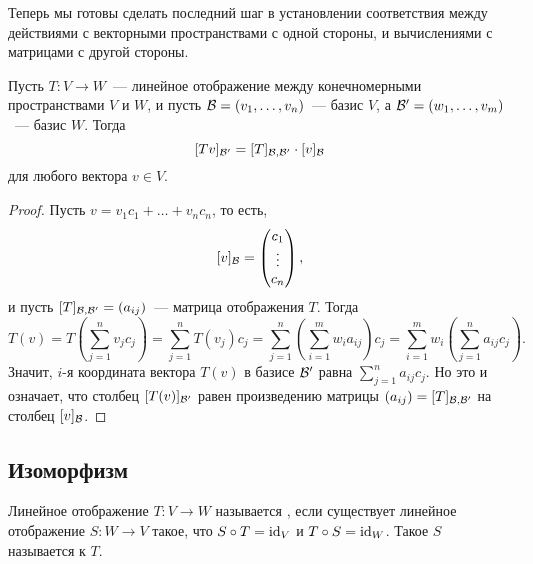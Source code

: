 Теперь мы готовы сделать последний шаг в установлении
соответствия между действиями с векторными пространствами
с одной стороны, и вычислениями с матрицами с другой стороны.

\begin{theorem}\label{thm:matrix-multiplied-by-vector}
Пусть $T\colon V\to W$~--- линейное отображение между
конечномерными пространствами $V$ и $W$, и пусть
$\mathcal B = (v_1,\dots,v_n)$~--- базис $V$, а
$\mathcal B' = (w_1,\dots,v_m)$~--- базис $W$.
Тогда
$$
[Tv]_{\mathcal B'} = [T]_{\mathcal B,\mathcal B'}\cdot [v]_{\mathcal B}
$$
для любого вектора $v\in V$.
\end{theorem}
\begin{proof}
Пусть $v = v_1c_1 + \dots + v_nc_n$, то есть,
$$
[v]_{\mathcal B} = \begin{pmatrix} c_1 \\ \vdots \\ c_n
\end{pmatrix},
$$
и пусть
$[T]_{\mathcal B,\mathcal B'} = (a_{ij})$~--- матрица отображения $T$.
Тогда
$$
T(v) = T(\sum_{j=1}^n v_j c_j) = \sum_{j=1}^n T(v_j)c_j
= \sum_{j=1}^n \left( \sum_{i=1}^m w_ia_{ij}\right) c_j
= \sum_{i=1}^m w_i \left( \sum_{j=1}^n a_{ij}c_j \right).
$$
Значит, $i$-я координата вектора $T(v)$ в базисе $\mathcal B'$
равна $\sum_{j=1}^n a_{ij}c_j$.
Но это и означает, что столбец $[T(v)]_{\mathcal B'}$ равен
произведению матрицы $(a_{ij}) = [T]_{\mathcal B,\mathcal B'}$
на столбец $[v]_{\mathcal B}$.
\end{proof}

\subsection{Изоморфизм}

\begin{definition}
Линейное отображение $T\colon V\to W$ называется , если
существует линейное отображение $S\colon W\to V$ такое, что $S\circ T = \operatorname{id}_V$
и $T\circ S = \operatorname{id}_W$. Такое $S$ называется  к $T$.
\end{definition}

